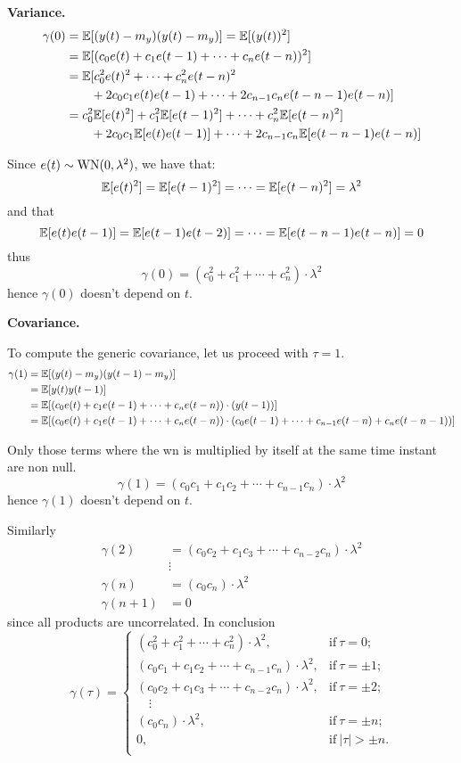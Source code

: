 \textbf{Variance.}
\begin{align*}
	\gamma (0)&=\mathbb{E}[(y(t)-m_{y})(y(t)-m_{y})]=\mathbb{E}[(y(t))^2]\\
	&=\mathbb{E}[(c_{0} e(t)+c_{1} e(t-1)+\cdots+c_{n} e(t-n))^{2}]\\
	&=\mathbb{E}[c_{0}^{2} e(t)^{2}+\cdots+c_{n}^{2} e(t-n)^{2}\\
	&\qquad+2 c_{0} c_{1} e(t) e(t-1)+\cdots+2 c_{n-1} c_{n} e(t-n-1) e(t-n)]\\
	&=c_{0}^{2} \mathbb{E}[e(t)^{2}]+c_{1}^{2} \mathbb{E}[e(t-1)^{2}]+\cdots+c_{n}^{2} \mathbb{E}[e(t-n)^{2}]\\
	&\qquad+2 c_{0} c_{1} \mathbb{E}[e(t) e(t-1)]+\cdots+2 c_{n-1} c_{n} \mathbb{E}[e(t-n-1) e(t-n)]
\end{align*}

Since $e(t) \sim \operatorname{WN}(0, \lambda^{2})$, we have that:
$$
\mathbb{E}[e(t)^{2}]=\mathbb{E}[e(t-1)^{2}]=\cdots=\mathbb{E}[e(t-n)^{2}]=\lambda^{2}
$$
and that
$$
\mathbb{E}[e(t) e(t-1)] = \mathbb{E}[e(t-1) e(t-2)] = \cdots = \mathbb{E}[e(t-n-1) e(t-n)]=0
$$
thus
\[
	\boxed{\gamma (0)=(c_{0}^2 +c_{1}^2 +\cdots+c_{n}^2 )\cdot\lambda^2}
\]
hence $\gamma (0)$ doesn't depend on $t$.

\textbf{Covariance.}

To compute the generic covariance, let us proceed with $\tau =1$.
\begin{align*}
	\gamma(1)&=\mathbb{E}[(y(t)-m_{y})(y(t-1)-m_{y})]\\
	&=\mathbb{E}[y(t) y(t-1)]\\
	&=\mathbb{E}[(c_{0} e(t)+c_{1} e(t-1)+\cdots+c_{n} e(t-n))\cdot (y(t-1))]\\
	&=\mathbb{E}[(c_{0} e(t)+c_{1} e(t-1)+\cdots+c_{n} e(t-n))\cdot (c_{0} e(t-1)+\cdots+c_{n-1} e(t-n)+c_{n} e(t-n-1))]
\end{align*}

Only those terms where the \gls{wn} is multiplied by itself at the same time instant are non null.
\[
	\gamma (1)=(c_{0}c_{1}+c_{1}c_{2}+\cdots+c_{n-1}c_{n})\cdot\lambda^2
\]
hence $\gamma (1)$ doesn't depend on $t$.

Similarly
\begin{align*}
	\gamma (2) &= (c_{0}c_{2}+c_{1}c_{3}+\cdots+c_{n-2}c_{n})\cdot\lambda^2\\
	&\vdots\\
	\gamma (n) &= (c_{0}c_{n})\cdot\lambda^2\\
	\gamma (n+1) &= 0
\end{align*}
since all products are uncorrelated. In conclusion
\[
	\boxed{
		\gamma (\tau )=\begin{cases}
			(c_{0}^2 +c_{1}^2 +\cdots+c_{n}^2 )\cdot\lambda^2, & \text{if}\ \tau =0;\\
			(c_{0}c_{1}+c_{1}c_{2}+\cdots+c_{n-1}c_{n})\cdot\lambda^2, & \text{if}\ \tau =\pm 1;\\
			(c_{0}c_{2}+c_{1}c_{3}+\cdots+c_{n-2}c_{n})\cdot\lambda^2, & \text{if}\ \tau =\pm 2;\\
			\quad\vdots\\
			(c_{0}c_{n})\cdot\lambda^2, & \text{if}\ \tau =\pm n;\\
			0, & \text{if}\ |\tau| > \pm n.\\
		\end{cases}
	}
\]
